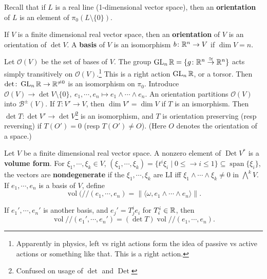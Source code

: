 Recall that if $L$ is a real line (1-dimensional vector space), then an \textbf{orientation} of $L$ is an element of $\pi_0(L \setminus \{0\} )$.

\begin{definition}[]
    If $V$ is a finite dimensional real vector space, then an \textbf{orientation} of $V$ is an orientation of $\det V$. A \textbf{basis} of $V$ is an isomorphism $b \colon \mathbb{R}^n  \to V$ if $\dim V=n$.
\end{definition}
\begin{remark}
    Let $\mathcal{O} (V)$ be the set of bases of $V$. The group $\operatorname{GL}_n \mathbb{R}=\{g \colon \mathbb{R}^n \overset{\simeq}{\to } \mathbb{R}^n \} $ acts simply transitively on $\mathcal{O} (V)$.\footnote{Apparently in physics, left vs right actions form the idea of passive vs active actions or something like that. This is a right action.} This is a right action $\operatorname{GL}_n \mathbb{R}$, or a torsor. Then $\det \colon \operatorname{GL}_n \mathbb{R} \to \mathbb{R}^{\neq 0}$ is an isomorphism on $\pi_0$. Introduce $\mathcal{O} (V) \to \det V \setminus \{0\} ,\ e_1,\cdots ,e_n  \mapsto e_1\wedge \cdots \wedge e_n $. An orientation partitions $\mathcal{O} (V)$ into $\mathcal{B} ^{\pm}(V)$. If $T \colon V' \to V$, then $\dim V'=\dim V$ if $T$ is an ismorphism. Then $\det T \colon \det V' \to \det V$\footnote{Confused on usage of $\det$ and $\operatorname{Det}$} is an isomorphism, and $T$ is orientation preserving (resp reversing) if $T(O')=0$ (resp $T(O')\neq O$). (Here $O$ denotes the orientation of a space.)
\end{remark}
\begin{definition}[]
    Let $V$ be a finite dimensional real vector space. A nonzero element of $\operatorname{Det}V^*$ is a \textbf{volume form}. For $\xi_1,\cdots ,\xi_k \in V$, $(\xi_1,\cdots ,\xi_k)=\{t ^i \xi_i  \mid 0 \leq \to i \leq 1\} \subseteq \operatorname{span}\{\xi_i \} $, the vectors are \textbf{nondegenerate} if the $\xi_1,\cdots ,\xi_k$ are LI iff $\xi_1\wedge \cdots \wedge \xi_k\neq 0$ in $\bigwedge ^k V$. If $e_1,\cdots ,e_n $ is a basis of $V$, define \[
        \operatorname{vol}( //(e_1,\cdots ,e_n )= \|\langle \omega, e_1\wedge \cdots \wedge e_n  \rangle \|.
    \] 
\end{definition}
\begin{prop}
    If $e_1',\cdots ,e_n '$ is another basis, and $e_j '=T_j ^i e_i $ for $T_i ^i  \in \mathbb{R}$, then \[
        \operatorname{vol}// (e_1',\cdots ,e_n ')=(\det T) \operatorname{vol} // (e_1,\cdots ,e_n ).
    \] 
\end{prop}
